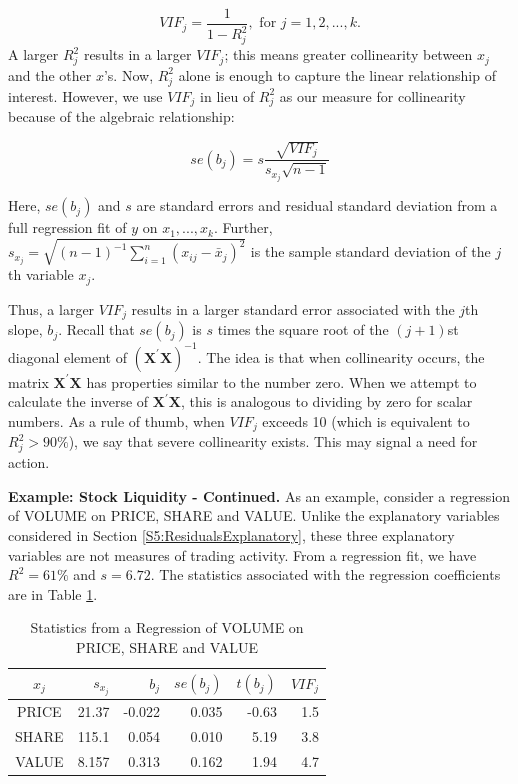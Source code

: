 \begin{equation*}
VIF_j=\frac{1}{1-R_j^2},\text{ \ \ \ for \ }j=1,2,...,k.
\end{equation*}
A larger $R_j^2$ results in a larger $VIF_j$; this means greater
collinearity between $x_j$ and the other $x$'s. Now, $R_j^2$ alone
is enough to capture the linear relationship of interest. However,
we use $VIF_j$ in lieu of $R_j^2$ as our measure for collinearity
because of the algebraic relationship:

\begin{equation} \label{E5:SEsAndVIFs}
se(b_j) = s \frac{\sqrt{VIF_j}}{s_{x_j}\sqrt{n-1}}
\end{equation}

\noindent Here, $se(b_j)$ and $s$ are standard errors and residual
standard deviation from a full regression fit of $y$ on
$x_1,...,x_{k}$. Further, $s_{x_j} = \sqrt{(n-1)^{-1}
\sum_{i=1}^{n}(x_{ij}-\bar{x}_j)^2 }$ is the sample standard
deviation of the $j$th variable $x_j$.

Thus, a larger $VIF_j$ results in a larger standard error associated
with the $j$th slope, $b_j$. Recall that $se(b_j)$ is $s$ times the
square root of the $(j+1)$st diagonal element of
$(\mathbf{X^{\prime} X})^{-1}$. The idea is that when collinearity
occurs, the matrix $\mathbf{X^{\prime}X}$ has properties similar to
the number zero. When we attempt to calculate the inverse of
$\mathbf{X^{\prime} X}$, this is analogous to dividing by zero for
scalar numbers. As a rule of thumb, when $VIF_j$ exceeds 10 (which
is equivalent to $R_j^2>90\%$), we say that severe collinearity
exists. This may signal a need for action.


\linejed

\textbf{Example: Stock Liquidity - Continued.} As an example,
consider a regression of VOLUME on PRICE, SHARE and VALUE. Unlike
the explanatory variables considered in Section
\ref{S5:ResidualsExplanatory}, these three explanatory variables are
not measures of trading activity. From a regression fit, we have
$R^2=61\%$ and $s=6.72$. The statistics associated with the
regression coefficients are in Table \ref{T5:LiquidRegression}.


\begin{table}[h]
\caption{\label{T5:LiquidRegression} Statistics from
a Regression of VOLUME on PRICE, SHARE and VALUE}

\begin{tabular}{crrrrr}
\hline
$x_j$ & $s_{x_j}$ & $b_j$ & $se(b_j)$ & $t(b_j)$ & $VIF_j$ \\
\hline PRICE& 21.37 & -0.022 & 0.035&
-0.63& 1.5 \\
SHARE & 115.1 & 0.054 & 0.010 &
5.19 & 3.8 \\
VALUE & 8.157 & 0.313 & 0.162 & 1.94 & 4.7
\\ \hline
\end{tabular}
\end{table}

